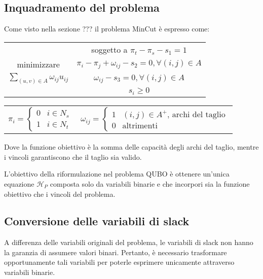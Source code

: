 \documentclass{article}
\begin{document}
\subsection{Inquadramento del problema}
Come visto nella sezione ??? il problema MinCut è espresso come:
\begin{center}
\begin{table}[H]
    \centering
    \begin{tabular}{c|c}
        & soggetto a $\pi_t - \pi_s - s_1 = 1$ \\
        minimizzare & $\pi_i - \pi_j + \omega_{ij} - s_2= 0, \forall (i, j) \in A$\\
        $\sum_{(u, v) \in A} \omega_{ij}u_{ij}$ & $\omega_{ij} - s_3 = 0, \forall (i, j) \in A$\\
        & $s_i \geq 0$
    \end{tabular}
\end{table}

\begin{table}
    \centering
    \begin{tabular}{cc}
        $\pi_i = \begin{cases}
            0 & i \in N_s\\
            1 & i \in N_t
        \end{cases}$ 
        & 
        $\omega_{ij} = \begin{cases}
            1 & \text{$(i, j) \in A^+$, archi del taglio}\\
            0 & \text{altrimenti}
        \end{cases}$
    \end{tabular}
\end{table}
\end{center}

Dove la funzione obiettivo è la somma delle capacità degli archi del taglio, mentre i vincoli garantiscono che il taglio sia valido.

L'obiettivo della riformulazione nel problema QUBO è ottenere un'unica equazione $\mathcal{H}_P$ composta solo da variabili binarie e che incorpori sia la funzione obiettivo che i vincoli del problema.

\subsection{Conversione delle variabili di slack}
A differenza delle variabili originali del problema, le variabili di slack non hanno la garanzia di assumere valori binari. Pertanto, è necessario trasformare opportunamente tali variabili per poterle esprimere unicamente attraverso variabili binarie.
\end{document}
